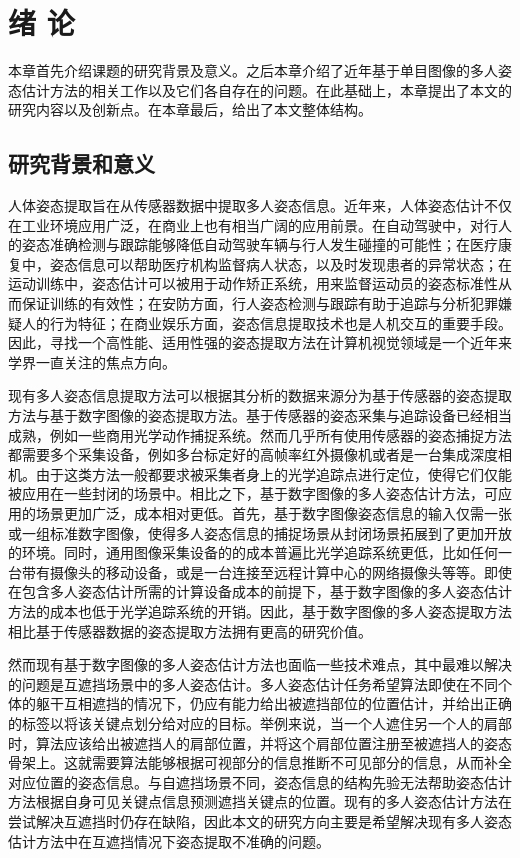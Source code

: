 \chapter{绪 论}
\label{cha:intro}

本章首先介绍课题的研究背景及意义。之后本章介绍了近年基于单目图像的多人姿态估计方法的相关工作以及它们各自存在的问题。在此基础上，本章提出了本文的研究内容以及创新点。在本章最后，给出了本文整体结构。

\section{研究背景和意义}
\label{sec:generalbackground}
人体姿态提取旨在从传感器数据中提取多人姿态信息。近年来，人体姿态估计不仅在工业环境应用广泛，在商业上也有相当广阔的应用前景。在自动驾驶中，对行人的姿态准确检测与跟踪能够降低自动驾驶车辆与行人发生碰撞的可能性；在医疗康复中，姿态信息可以帮助医疗机构监督病人状态，以及时发现患者的异常状态；在运动训练中，姿态估计可以被用于动作矫正系统，用来监督运动员的姿态标准性从而保证训练的有效性；在安防方面，行人姿态检测与跟踪有助于追踪与分析犯罪嫌疑人的行为特征；在商业娱乐方面，姿态信息提取技术也是人机交互的重要手段。因此，寻找一个高性能、适用性强的姿态提取方法在计算机视觉领域是一个近年来学界一直关注的焦点方向。

现有多人姿态信息提取方法可以根据其分析的数据来源分为基于传感器的姿态提取方法与基于数字图像的姿态提取方法。基于传感器的姿态采集与追踪设备已经相当成熟，例如一些商用光学动作捕捉系统。然而几乎所有使用传感器的姿态捕捉方法都需要多个采集设备，例如多台标定好的高帧率红外摄像机或者是一台集成深度相机。由于这类方法一般都要求被采集者身上的光学追踪点进行定位，使得它们仅能被应用在一些封闭的场景中。相比之下，基于数字图像的多人姿态估计方法，可应用的场景更加广泛，成本相对更低。首先，基于数字图像姿态信息的输入仅需一张或一组标准数字图像，使得多人姿态信息的捕捉场景从封闭场景拓展到了更加开放的环境。同时，通用图像采集设备的的成本普遍比光学追踪系统更低，比如任何一台带有摄像头的移动设备，或是一台连接至远程计算中心的网络摄像头等等。即使在包含多人姿态估计所需的计算设备成本的前提下，基于数字图像的多人姿态估计方法的成本也低于光学追踪系统的开销。因此，基于数字图像的多人姿态提取方法相比基于传感器数据的姿态提取方法拥有更高的研究价值。

然而现有基于数字图像的多人姿态估计方法也面临一些技术难点，其中最难以解决的问题是互遮挡场景中的多人姿态估计。多人姿态估计任务希望算法即使在不同个体的躯干互相遮挡的情况下，仍应有能力给出被遮挡部位的位置估计，并给出正确的标签以将该关键点划分给对应的目标。举例来说，当一个人遮住另一个人的肩部时，算法应该给出被遮挡人的肩部位置，并将这个肩部位置注册至被遮挡人的姿态骨架上。这就需要算法能够根据可视部分的信息推断不可见部分的信息，从而补全对应位置的姿态信息。与自遮挡场景不同，姿态信息的结构先验无法帮助姿态估计方法根据自身可见关键点信息预测遮挡关键点的位置。现有的多人姿态估计方法在尝试解决互遮挡时仍存在缺陷，因此本文的研究方向主要是希望解决现有多人姿态估计方法中在互遮挡情况下姿态提取不准确的问题。

